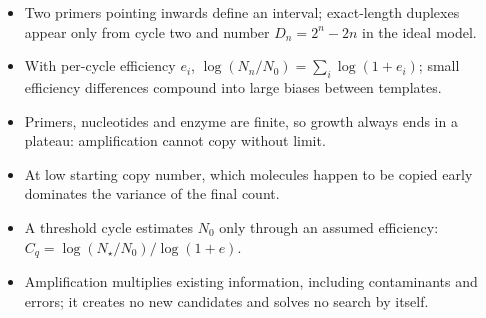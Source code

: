 \begin{KeyIdeas}
\begin{itemize}\setlength{\itemsep}{2pt}
\item Two primers pointing inwards define an interval; exact-length duplexes
appear only from cycle two and number $D_n=2^n-2n$ in the ideal model.
\item With per-cycle efficiency $e_i$, $\log(N_n/N_0)=\sum_i\log(1+e_i)$; small
efficiency differences compound into large biases between templates.
\item Primers, nucleotides and enzyme are finite, so growth always ends in a
plateau: amplification cannot copy without limit.
\item At low starting copy number, which molecules happen to be copied early
dominates the variance of the final count.
\item A threshold cycle estimates $N_0$ only through an assumed efficiency:
$C_q=\log(N_\star/N_0)/\log(1+e)$.
\item Amplification multiplies existing information, including contaminants and
errors; it creates no new candidates and solves no search by itself.
\end{itemize}
\end{KeyIdeas}


